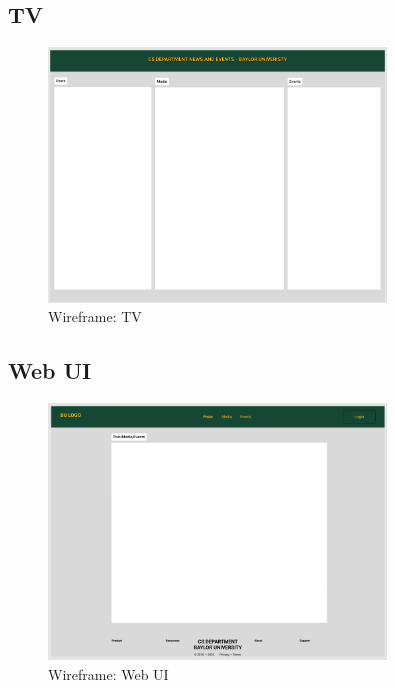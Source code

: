 \documentclass{article}
\begin{document}
\subsection{TV}
\begin{figure}[H]
    \centering
    \includegraphics[width=0.8\textwidth]{images/wireframe_TV_Display.png}
    \centering
    \caption{Wireframe: TV}
\end{figure}

\subsection{Web UI}
\begin{figure}[H]
    \centering
    \includegraphics[width=0.8\textwidth]{images/wireframe_webUI.png}
    \centering
    \caption{Wireframe: Web UI}
\end{figure}
\end{document}
